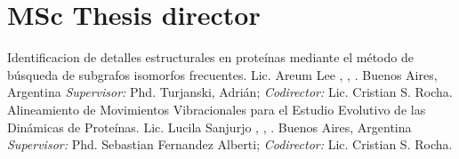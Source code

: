 	\bibliographyunit
	\begin{bibunit}[plain]
		\nocite{*}
		\putbib[csrocha]
	\end{bibunit}

\section{MSc Thesis director}

	{Identificacion de detalles estructurales en proteínas mediante el método de búsqueda de subgrafos isomorfos frecuentes. Lic. Areum Lee}
	{\DC, \FCEN, \UBA.}
	{Buenos Aires, Argentina}
	{}
	{\emph{Supervisor:} Phd. Turjanski, Adrián; \emph{Codirector:} Lic. Cristian S. Rocha.}
	{Alineamiento de Movimientos Vibracionales para el Estudio Evolutivo de las Dinámicas de Proteínas. Lic. Lucila Sanjurjo} 
	{\DC, \FCEN, \UBA.}
	{Buenos Aires, Argentina}
	{}
	{\emph{Supervisor:} Phd. Sebastian Fernandez Alberti; \emph{Codirector:} Lic. Cristian S. Rocha.}

\label{cientificos:hasta}



